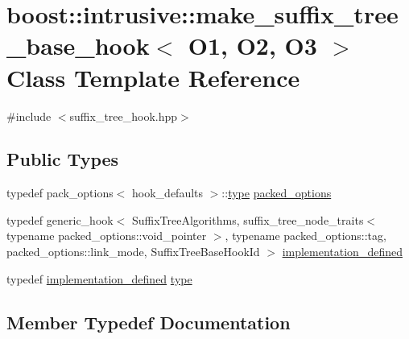 \hypertarget{classboost_1_1intrusive_1_1make__suffix__tree__base__hook}{}\section{boost\+:\+:intrusive\+:\+:make\+\_\+suffix\+\_\+tree\+\_\+base\+\_\+hook$<$ O1, O2, O3 $>$ Class Template Reference}
\label{classboost_1_1intrusive_1_1make__suffix__tree__base__hook}


{\ttfamily \#include $<$suffix\+\_\+tree\+\_\+hook.\+hpp$>$}

\subsection*{Public Types}
\begin{DoxyCompactItemize}
\item 
typedef pack\+\_\+options$<$ hook\+\_\+defaults $>$\+::\hyperlink{classboost_1_1intrusive_1_1make__suffix__tree__base__hook_a72474fe783f53cf3da5ff706894eefd6}{type} \hyperlink{classboost_1_1intrusive_1_1make__suffix__tree__base__hook_addb846ee0efa5e8b70f2788c2c6c3381}{packed\+\_\+options}
\item 
typedef generic\+\_\+hook$<$ Suffix\+Tree\+Algorithms, suffix\+\_\+tree\+\_\+node\+\_\+traits$<$ typename packed\+\_\+options\+::void\+\_\+pointer $>$, typename packed\+\_\+options\+::tag, packed\+\_\+options\+::link\+\_\+mode, Suffix\+Tree\+Base\+Hook\+Id $>$ \hyperlink{classboost_1_1intrusive_1_1make__suffix__tree__base__hook_a21cb881040ae75027aaa684f98669d45}{implementation\+\_\+defined}
\item 
typedef \hyperlink{classboost_1_1intrusive_1_1make__suffix__tree__base__hook_a21cb881040ae75027aaa684f98669d45}{implementation\+\_\+defined} \hyperlink{classboost_1_1intrusive_1_1make__suffix__tree__base__hook_a72474fe783f53cf3da5ff706894eefd6}{type}
\end{DoxyCompactItemize}


\subsection{Member Typedef Documentation}
\mbox{\label{classboost_1_1intrusive_1_1make__suffix__tree__base__hook_a21cb881040ae75027aaa684f98669d45}} 
